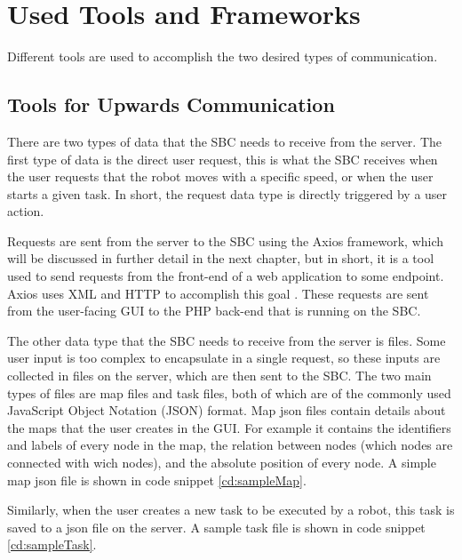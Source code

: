 \section{Used Tools and Frameworks} %
Different tools are used to accomplish the two desired types of communication.
\subsection{Tools for Upwards Communication}
There are two types of data that the SBC needs to receive from the server. The first type of data is the direct user request, this is what the SBC receives when the user requests that the robot moves with a specific speed, or when the user starts a given task. In short, the request data type is directly triggered by a user action.

Requests are sent from the server to the SBC using the Axios framework, which will be discussed in further detail in the next chapter, but in short, it is a tool used to send requests from the front-end of a web application to some endpoint. Axios uses XML and HTTP to accomplish this goal \cite{axios-intro}. These requests are sent from the user-facing GUI to the PHP back-end that is running on the SBC.

The other data type that the SBC needs to receive from the server is files. Some user input is too complex to encapsulate in a single request, so these inputs are collected in files on the server, which are then sent to the SBC. The two main types of files are map files and task files, both of which are of the commonly used JavaScript Object Notation (JSON) format. Map json files contain details about the maps that the user creates in the GUI. For example it contains the identifiers and labels of every node in the map, the relation between nodes (which nodes are connected with wich nodes), and the absolute position of every node. A simple map json file is shown in code snippet \ref{cd:sampleMap}.



Similarly, when the user creates a new task to be executed by a robot, this task is saved to a json file on the server. A sample task file is shown in code snippet \ref{cd:sampleTask}.



